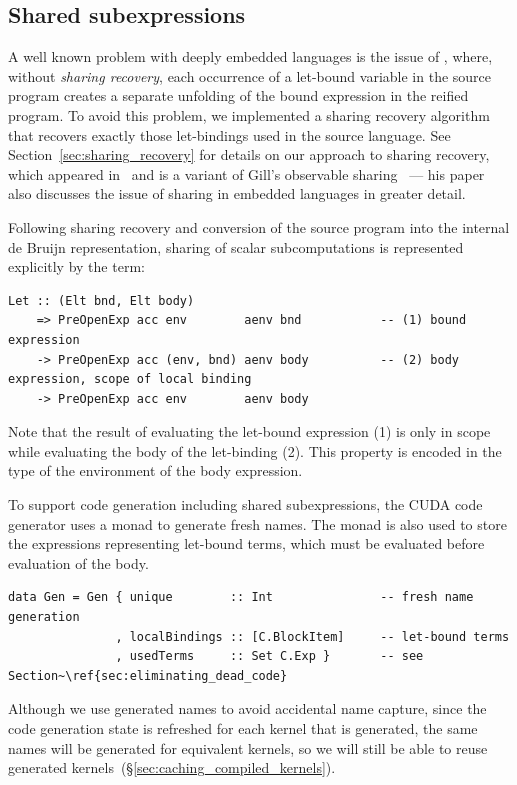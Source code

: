 \cg[tuples|)]{}

\subsection{Shared subexpressions}
\label{sec:shared_subexpressions}

\cg[sharing|(]{}

A well known problem with deeply embedded languages is the issue of
, where, without \emph{sharing recovery}, each occurrence of
a let-bound variable in the source program creates a separate unfolding of the
bound expression in the reified program. To avoid this problem, we implemented a
sharing recovery algorithm that recovers exactly those let-bindings used in the
source language. See Section~\ref{sec:sharing_recovery} for details on our
approach to sharing recovery, which appeared in~\cite{McDonell:2013wi} and is a
variant of Gill's observable sharing~\cite{Gill:2009dx} --- his paper also
discusses the issue of sharing in embedded languages in greater detail.

Following sharing recovery and conversion of the source program into the
internal de Bruijn representation, sharing of scalar subcomputations is
represented explicitly by the term:
%
\begin{lstlisting}[style=haskell]
Let :: (Elt bnd, Elt body)
    => PreOpenExp acc env        aenv bnd           -- (1) bound expression
    -> PreOpenExp acc (env, bnd) aenv body          -- (2) body expression, scope of local binding
    -> PreOpenExp acc env        aenv body
\end{lstlisting}
%
Note that the result of evaluating the let-bound expression (1) is only in scope
while evaluating the body of the let-binding (2). This property is encoded in
the type of the environment of the body expression.

To support code generation including shared subexpressions, the CUDA code
generator uses a monad to generate fresh names. The monad is also used to store
the expressions representing let-bound terms, which must be evaluated before
evaluation of the body.
%
\begin{lstlisting}[style=haskell]
data Gen = Gen { unique        :: Int               -- fresh name generation
               , localBindings :: [C.BlockItem]     -- let-bound terms
               , usedTerms     :: Set C.Exp }       -- see Section~\ref{sec:eliminating_dead_code}
\end{lstlisting}
%
Although we use generated names to avoid accidental name capture, since the code
generation state is refreshed for each kernel that is generated, the same names
will be generated for equivalent kernels, so we will still be able to reuse
generated kernels~(\S\ref{sec:caching_compiled_kernels}).

